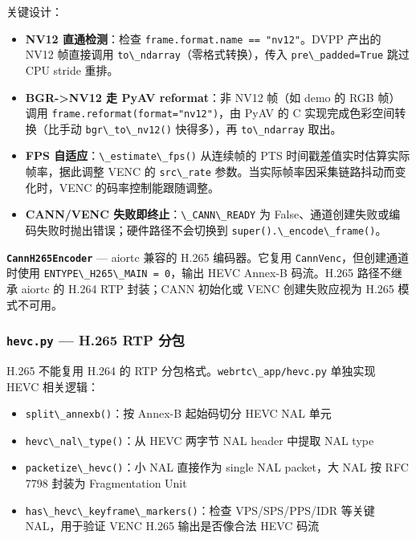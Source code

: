关键设计：

\begin{itemize}
\tightlist
\item
  \textbf{NV12 直通检测}：检查
  \passthrough{\lstinline!frame.format.name == "nv12"!}。DVPP 产出的
  NV12 帧直接调用
  \passthrough{\lstinline!to\_ndarray!}（零格式转换），传入
  \passthrough{\lstinline!pre\_padded=True!} 跳过 CPU stride 重排。
\item
  \textbf{BGR-\textgreater NV12 走 PyAV reformat}：非 NV12 帧（如 demo
  的 RGB 帧）调用
  \passthrough{\lstinline!frame.reformat(format="nv12")!}，由 PyAV 的 C
  实现完成色彩空间转换（比手动 \passthrough{\lstinline!bgr\_to\_nv12()!}
  快得多），再 \passthrough{\lstinline!to\_ndarray!} 取出。
\item
  \textbf{FPS 自适应}：\passthrough{\lstinline!\_estimate\_fps()!}
  从连续帧的 PTS 时间戳差值实时估算实际帧率，据此调整 VENC 的
  \passthrough{\lstinline!src\_rate!}
  参数。当实际帧率因采集链路抖动而变化时，VENC 的码率控制能跟随调整。
\item
  \textbf{CANN/VENC 失败即终止}：\passthrough{\lstinline!\_CANN\_READY!}
  为 False、通道创建失败或编码失败时抛出错误；硬件路径不会切换到
  \passthrough{\lstinline!super().\_encode\_frame()!}。
\end{itemize}

\textbf{\passthrough{\lstinline!CannH265Encoder!}} --- aiortc 兼容的
H.265 编码器。它复用
\passthrough{\lstinline!CannVenc!}，但创建通道时使用
\passthrough{\lstinline!ENTYPE\_H265\_MAIN = 0!}，输出 HEVC Annex-B
码流。H.265 路径不继承 aiortc 的 H.264 RTP 封装；CANN 初始化或 VENC
创建失败应视为 H.265 模式不可用。

\subsubsection{\texorpdfstring{\texttt{hevc.py} --- H.265 RTP
分包}{hevc.py --- H.265 RTP 分包}}\label{src-book-chapter6-h152}

H.265 不能复用 H.264 的 RTP
分包格式。\passthrough{\lstinline!webrtc\_app/hevc.py!} 单独实现 HEVC
相关逻辑：

\begin{itemize}
\tightlist
\item
  \passthrough{\lstinline!split\_annexb()!}：按 Annex-B 起始码切分 HEVC
  NAL 单元
\item
  \passthrough{\lstinline!hevc\_nal\_type()!}：从 HEVC 两字节 NAL header
  中提取 NAL type
\item
  \passthrough{\lstinline!packetize\_hevc()!}：小 NAL 直接作为 single
  NAL packet，大 NAL 按 RFC 7798 封装为 Fragmentation Unit
\item
  \passthrough{\lstinline!has\_hevc\_keyframe\_markers()!}：检查
  VPS/SPS/PPS/IDR 等关键 NAL，用于验证 VENC H.265 输出是否像合法 HEVC
  码流
\end{itemize}


